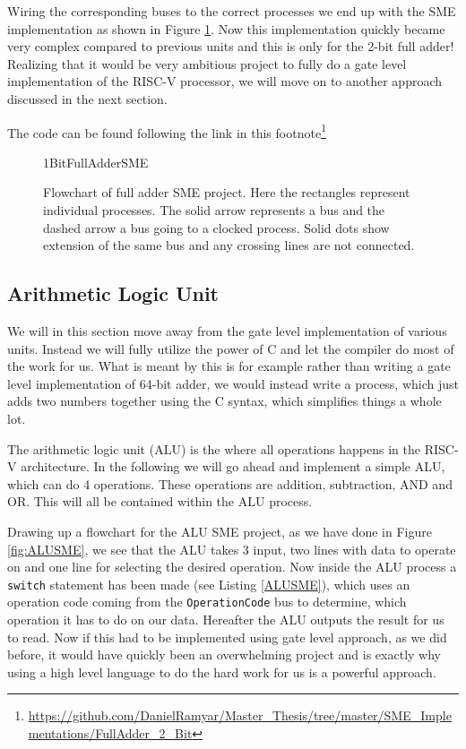         Wiring the corresponding buses to the correct processes we end up with the SME implementation as shown in Figure \ref{fig:1BitFullAdderSME}. Now this implementation quickly became very complex compared to previous units and this is only for the 2-bit full adder! Realizing that it would be very ambitious project to fully do a gate level implementation of the RISC-V processor, we will move on to another approach discussed in the next section. 
        
        The code can be found following the link in this footnote\footnote{\url{https://github.com/DanielRamyar/Master_Thesis/tree/master/SME_Implementations/FullAdder_2_Bit}}  
    
        \begin{figure}[h!]
            \centering
            {1BitFullAdderSME}
            \caption{Flowchart of full adder SME project. Here the rectangles represent individual processes. The solid arrow represents a bus and the dashed arrow a bus going to a clocked process. Solid dots show extension of the same bus and any crossing lines are not connected.}
            \label{fig:1BitFullAdderSME}
        \end{figure}
    
    \subsection{Arithmetic Logic Unit}
        We will in this section move away from the gate level implementation of various units. Instead we will fully utilize the power of C and let the compiler do most of the work for us. What is meant by this is for example rather than writing a gate level implementation of 64-bit adder, we would instead write a process, which just adds two numbers together using the C syntax, which simplifies things a whole lot.
        
        The arithmetic logic unit (ALU) is the where all operations happens in the RISC-V architecture. 
        In the following we will go ahead and implement a simple ALU, which can do 4 operations. These operations are addition, subtraction, AND and OR. This will all be contained within the ALU process.
        
        Drawing up a flowchart for the ALU SME project, as we have done in Figure \ref{fig:ALUSME}, we see that the ALU takes 3 input, two lines with data to operate on and one line for selecting the desired operation.
        Now inside the ALU process a \texttt{switch} statement has been made (see Listing \ref{ALUSME}), which uses an operation code coming from the \texttt{OperationCode} bus to determine, which operation it has to do on our data. Hereafter the ALU outputs the result for us to read.
        Now if this had to be implemented using gate level approach, as we did before, it would have quickly been an overwhelming project and is exactly why using a high level language to do the hard work for us is a powerful approach.
        
